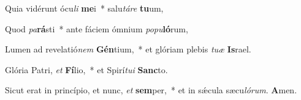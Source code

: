 \item Quia vidérunt ócu\textit{li} \textbf{me}i~* salu\hspace{0.03em}\textit{táre} \textbf{tu}um,
\item Quod \textit{pa}\textbf{rá}sti~* ante fáciem ómnium \textit{popu}\textbf{ló}rum,
\item Lumen ad revelatió\textit{nem} \textbf{Gén}tium,~* et glóriam plebis \textit{tuæ} \textbf{Is}rael.
\item Glória Patri, \textit{et} \textbf{Fí}lio,~* et Spirí\textit{tui} \textbf{Sanc}to.
\item Sicut erat in princípio, et nunc, \textit{et} \textbf{sem}per,~* et in sǽcula sæcu\hspace{0.03em}\textit{lórum}. \textbf{A}men.
